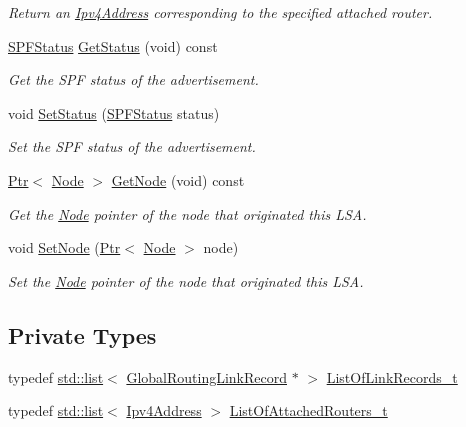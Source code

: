 \begin{DoxyCompactItemize}
\begin{DoxyCompactList}\small\item\em Return an \hyperlink{classns3_1_1Ipv4Address}{Ipv4\+Address} corresponding to the specified attached router. \end{DoxyCompactList}\item 
\hyperlink{classns3_1_1GlobalRoutingLSA_a18bf63da580856fe1cc158aa855af1bd}{S\+P\+F\+Status} \hyperlink{classns3_1_1GlobalRoutingLSA_a6cdf7cab5261c98b312cbf7e0ec91260}{Get\+Status} (void) const 
\begin{DoxyCompactList}\small\item\em Get the S\+PF status of the advertisement. \end{DoxyCompactList}\item 
void \hyperlink{classns3_1_1GlobalRoutingLSA_a0a3a59c56967eac866a2a3a2a5ded93f}{Set\+Status} (\hyperlink{classns3_1_1GlobalRoutingLSA_a18bf63da580856fe1cc158aa855af1bd}{S\+P\+F\+Status} status)
\begin{DoxyCompactList}\small\item\em Set the S\+PF status of the advertisement. \end{DoxyCompactList}\item 
\hyperlink{classns3_1_1Ptr}{Ptr}$<$ \hyperlink{classns3_1_1Node}{Node} $>$ \hyperlink{classns3_1_1GlobalRoutingLSA_abcca1c85e5cd06ee417fd1ab264b93ba}{Get\+Node} (void) const 
\begin{DoxyCompactList}\small\item\em Get the \hyperlink{classns3_1_1Node}{Node} pointer of the node that originated this L\+SA. \end{DoxyCompactList}\item 
void \hyperlink{classns3_1_1GlobalRoutingLSA_a75f588e4c849e00f611755a58125a88a}{Set\+Node} (\hyperlink{classns3_1_1Ptr}{Ptr}$<$ \hyperlink{classns3_1_1Node}{Node} $>$ node)
\begin{DoxyCompactList}\small\item\em Set the \hyperlink{classns3_1_1Node}{Node} pointer of the node that originated this L\+SA. \end{DoxyCompactList}\end{DoxyCompactItemize}
\subsection*{Private Types}
\begin{DoxyCompactItemize}
\item 
typedef \hyperlink{openflow-interface_8h_afd9bcfa176617760671b67580f536fa7}{std\+::list}$<$ \hyperlink{classns3_1_1GlobalRoutingLinkRecord}{Global\+Routing\+Link\+Record} $\ast$ $>$ \hyperlink{classns3_1_1GlobalRoutingLSA_a8bbba2d0ab5355f5f3e211c3137e9183}{List\+Of\+Link\+Records\+\_\+t}
\item 
typedef \hyperlink{openflow-interface_8h_afd9bcfa176617760671b67580f536fa7}{std\+::list}$<$ \hyperlink{classns3_1_1Ipv4Address}{Ipv4\+Address} $>$ \hyperlink{classns3_1_1GlobalRoutingLSA_a1eb32d6aae2322830368720d24a39a65}{List\+Of\+Attached\+Routers\+\_\+t}
\end{DoxyCompactItemize}
